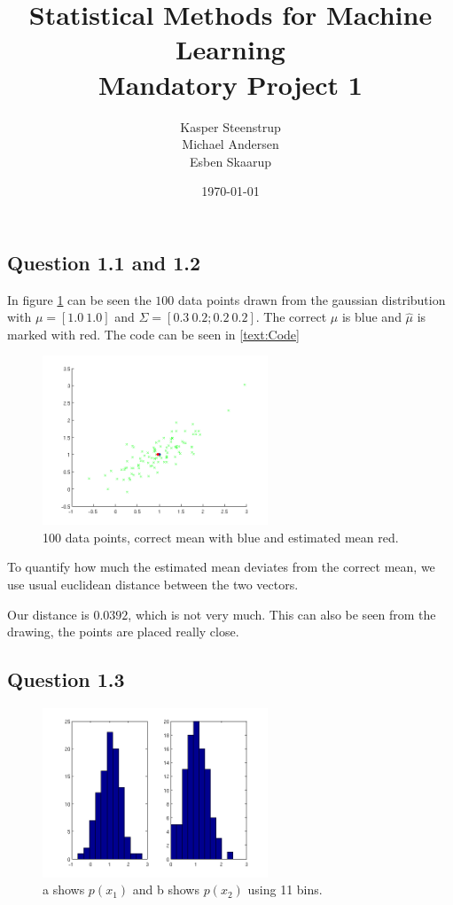 \documentclass[a4paper, 10pt, final]{article}
\title{Statistical Methods for Machine Learning \\ Mandatory Project 1}
\author{Kasper Steenstrup\\Michael Andersen\\Esben Skaarup}
\date{\today}
\begin{document}
\maketitle

\subsection*{Question 1.1 and 1.2}

In figure \ref{fig:q1_1} can be seen the $100$ data points drawn from
the gaussian distribution with $\mu = [1.0~ 1.0]$ and $\Sigma = [0.3~
  0.2; 0.2~ 0.2]$. The correct $\mu$ is blue and $\widehat{\mu}$ is
marked with red. The code can be seen in \ref{text:Code}

\begin{figure}[!htpb]
  \centering
  \includegraphics[width=0.6\textwidth]{images/q1_1}
  \caption{100 data points, correct mean with blue and estimated mean red.}
  \label{fig:q1_1}
\end{figure}

To quantify how much the estimated mean deviates from the correct
mean, we use usual euclidean distance between the two vectors.

Our distance is $0.0392$, which is not very much. This can also be
seen from the drawing, the points are placed really close.

\subsection*{Question 1.3}

\begin{figure}[!htpbpb]
  \centering
  \includegraphics[width=0.6\textwidth]{images/q1_3a}
  \caption{a shows $p(x_1)$ and b shows $p(x_2)$ using 11 bins.}
  \label{fig:q3_3a}
\end{figure}
\end{document}
